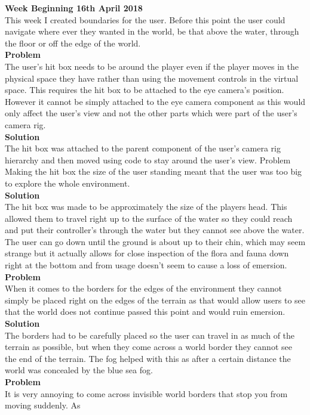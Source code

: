 \documentclass[10pt, a4paper]{article}
\begin{document}
	\textbf{Week Beginning 16th April 2018}\\
	This week I created boundaries for the user. Before this point the user could navigate where ever
	they wanted in the world, be that above the water, through the floor or off the edge of the world.\\
	\textbf{Problem}\\
	The user's hit box needs to be around the player even if the player moves in the physical space they
	have rather than using the movement controls in the virtual space. This requires the hit box to be
	attached to the eye camera's position. However it cannot be simply attached to the eye camera
	component as this would only affect the user's view and not the other parts which were part of the
	user's camera rig.\\
	\textbf{Solution}\\
	The hit box was attached to the parent component of the user's camera rig hierarchy and then
	moved using code to stay around the user's view.
	Problem
	Making the hit box the size of the user standing meant that the user was too big to explore the
	whole environment.\\
	\textbf{Solution}\\
	The hit box was made to be approximately the size of the players head. This allowed them to travel
	right up to the surface of the water so they could reach and put their controller's through the water
	but they cannot see above the water. The user can go down until the ground is about up to their
	chin, which may seem strange but it actually allows for close inspection of the flora and fauna down
	right at the bottom and from usage doesn't seem to cause a loss of emersion.\\
	\textbf{Problem}\\
	When it comes to the borders for the edges of the environment they cannot simply be placed right
	on the edges of the terrain as that would allow users to see that the world does not continue passed
	this point and would ruin emersion.\\
	\textbf{Solution}\\
	The borders had to be carefully placed so the user can travel in as much of the terrain as possible,
	but when they come across a world border they cannot see the end of the terrain. The fog helped
	with this as after a certain distance the world was concealed by the blue sea fog.\\
	\textbf{Problem}\\
	It is very annoying to come across invisible world borders that stop you from moving suddenly. As
\end{document}

